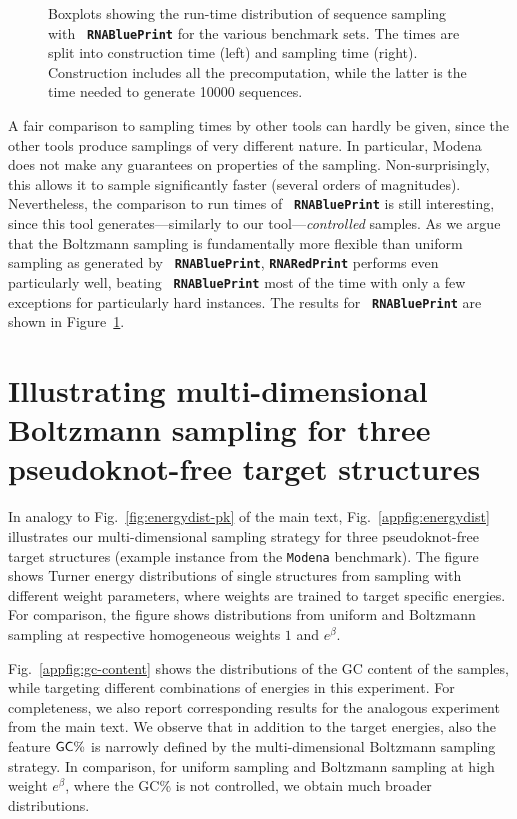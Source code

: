 \documentclass[10pt]{article}
\newcommand{\Nuc}[1]{{\sf #1}}
\newcommand{\Cb}{\Nuc{C}}
\newcommand{\Gb}{\Nuc{G}}
\newcommand{\GCb}{\Gb\Cb}
\newcommand{\RNAblueprint}{{\tt \bfseries{}\color{black!85} RNA\textcolor{blue!70!black}{Blue}Print}}
\newcommand{\ourprog}{{\tt \bfseries{}\color{black!85}RNA\textcolor{red!70!black}{Red}Print}}
\newenvironment{revision}{\color{red}}{\color{black}}
\begin{document}
\begin{revision}
\begin{figure}[h!]
  \caption{Boxplots showing the run-time distribution of sequence sampling with \RNAblueprint{} for the various benchmark sets. The times are split into construction time (left) and sampling time (right). Construction includes all the precomputation, while the latter is the time needed to generate 10000 sequences.}
  \label{appfig:run-times-rbp}
\end{figure}

A fair comparison to sampling times by other tools can hardly be given, since the other tools produce samplings of very different nature. In particular, Modena does not make any guarantees on properties of the sampling. Non-surprisingly, this allows it to sample significantly faster (several orders of magnitudes).
Nevertheless, the comparison to run times of \RNAblueprint{} is still interesting, since this tool generates---similarly to our tool---\emph{controlled} samples. As we argue that the Boltzmann sampling is fundamentally more flexible than uniform sampling as generated by \RNAblueprint, \ourprog{} performs even particularly well, beating \RNAblueprint{} most of the time with only a few exceptions for particularly hard instances. The results for \RNAblueprint{} are shown in Figure~\ref{appfig:run-times-rbp}.

\end{revision}

\section{Illustrating multi-dimensional Boltzmann sampling for three pseudoknot-free target structures}
\label{appsec:illustrating-mdbs}

In analogy to Fig.~\ref{fig:energydist-pk} of the main text,
    Fig.~\ref{appfig:energydist} illustrates our multi-dimensional sampling
    strategy for three pseudoknot-free target structures (example instance
    from the \texttt{Modena} benchmark). The figure shows Turner energy
    distributions of single structures from sampling with different weight
    parameters, where weights are trained to target specific energies. For
    comparison, the figure shows distributions from uniform and Boltzmann
    sampling at respective homogeneous weights $1$ and $e^\beta$.

    Fig.~\ref{appfig:gc-content} shows the distributions of the GC content of the samples, while targeting different combinations of energies in this experiment. For completeness, we also report corresponding results for the analogous experiment from the main text. We observe that in addition to the target energies, also the feature $\GCb\%$ is narrowly defined by the multi-dimensional Boltzmann sampling strategy. In comparison, for uniform sampling and Boltzmann sampling at high weight $e^\beta$, where the \GCb\% is not controlled, we obtain much broader distributions. 
\end{document}
